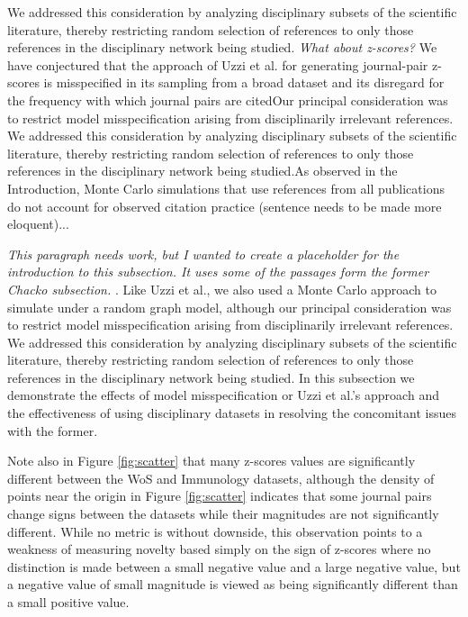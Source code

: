 \documentclass[NETN]{stjour}
\begin{document}
We addressed this consideration by analyzing disciplinary subsets of the scientific literature, thereby restricting random selection of references to only those references in the disciplinary network being studied.
\emph{What about z-scores?} 
We have conjectured that the approach of Uzzi et al. for generating journal-pair z-scores is misspecified in its sampling from a broad dataset and its disregard for the frequency with which journal pairs are citedOur principal consideration was to restrict model misspecification arising from disciplinarily irrelevant references. We addressed this consideration by analyzing disciplinary subsets of the scientific literature, thereby restricting random selection of references to only those references in the disciplinary network being studied.As observed in the Introduction, Monte Carlo simulations that use references from all publications do not account for observed citation practice (sentence needs to be made more eloquent)...

\emph{This paragraph needs work, but I wanted to create a placeholder for the introduction to this subsection.  It uses some of the passages form the former Chacko subsection.} . Like Uzzi et al., we also used a Monte Carlo approach to simulate under a random graph model, although our principal consideration was to restrict model misspecification arising from disciplinarily irrelevant references. We addressed this consideration by analyzing disciplinary subsets of the scientific literature, thereby restricting random selection of references to only those references in the disciplinary network being studied.  In this subsection we demonstrate the effects of model misspecification or Uzzi et al.'s approach and the effectiveness of using disciplinary datasets in resolving the concomitant issues with the former.

Note also in Figure \ref{fig:scatter} that many z-scores values are significantly different between the WoS and Immunology datasets, although the density of points near the origin in Figure \ref{fig:scatter} indicates that some journal pairs change signs between the datasets while their magnitudes are not significantly different. While no metric is without downside, this observation points to a weakness of measuring novelty based simply on the sign of z-scores where no distinction is made between a small negative value and a large negative value, but a negative value of small magnitude is viewed as being significantly different than a small positive value.
\end{document}
